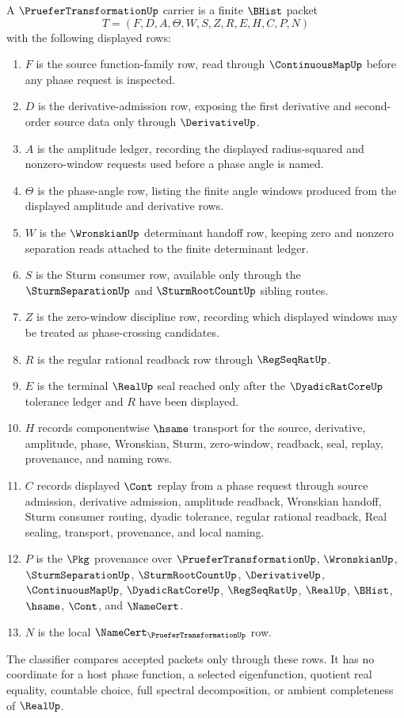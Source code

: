 \begin{definition}
\label{def:pruefer-transformation-carrier}
A $\PrueferTransformationUp$ carrier is a finite $\BHist$ packet
$$
T=(F,D,A,\Theta,W,S,Z,R,E,H,C,P,N)
$$
with the following displayed rows:
\begin{enumerate}
\item $F$ is the source function-family row, read through $\ContinuousMapUp$ before any phase request is inspected.
\item $D$ is the derivative-admission row, exposing the first derivative and second-order source data only through $\DerivativeUp$.
\item $A$ is the amplitude ledger, recording the displayed radius-squared and nonzero-window requests used before a phase angle is named.
\item $\Theta$ is the phase-angle row, listing the finite angle windows produced from the displayed amplitude and derivative rows.
\item $W$ is the $\WronskianUp$ determinant handoff row, keeping zero and nonzero separation reads attached to the finite determinant ledger.
\item $S$ is the Sturm consumer row, available only through the $\SturmSeparationUp$ and $\SturmRootCountUp$ sibling routes.
\item $Z$ is the zero-window discipline row, recording which displayed windows may be treated as phase-crossing candidates.
\item $R$ is the regular rational readback row through $\RegSeqRatUp$.
\item $E$ is the terminal $\RealUp$ seal reached only after the $\DyadicRatCoreUp$ tolerance ledger and $R$ have been displayed.
\item $H$ records componentwise $\hsame$ transport for the source, derivative, amplitude, phase, Wronskian, Sturm, zero-window, readback, seal, replay, provenance, and naming rows.
\item $C$ records displayed $\Cont$ replay from a phase request through source admission, derivative admission, amplitude readback, Wronskian handoff, Sturm consumer routing, dyadic tolerance, regular rational readback, Real sealing, transport, provenance, and local naming.
\item $P$ is the $\Pkg$ provenance over $\PrueferTransformationUp$, $\WronskianUp$, $\SturmSeparationUp$, $\SturmRootCountUp$, $\DerivativeUp$, $\ContinuousMapUp$, $\DyadicRatCoreUp$, $\RegSeqRatUp$, $\RealUp$, $\BHist$, $\hsame$, $\Cont$, and $\NameCert$.
\item $N$ is the local $\NameCert_{\PrueferTransformationUp}$ row.
\end{enumerate}
The classifier compares accepted packets only through these rows. It has no coordinate for a host phase function, a selected eigenfunction, quotient real equality, countable choice, full spectral decomposition, or ambient completeness of $\RealUp$.
\end{definition}

